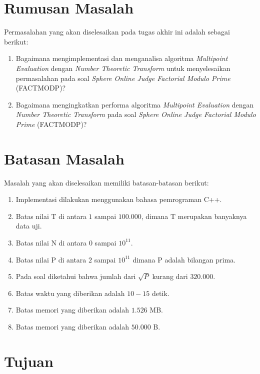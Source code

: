 \section {Rumusan Masalah}

Permasalahan yang akan diselesaikan pada tugas akhir ini adalah sebagai berikut:

\begin {enumerate}
\item Bagaimana mengimplementasi dan menganalisa algoritma \textit{Multipoint Evaluation} dengan \textit{Number Theoretic Transform} untuk menyelesaikan permasalahan pada soal \textit{Sphere Online Judge Factorial Modulo Prime} (FACTMODP\cite{factmodp})?
\item Bagaimana mengingkatkan performa algoritma \textit{Multipoint Evaluation} dengan \textit{Number Theoretic Transform} pada soal \textit{Sphere Online Judge Factorial Modulo Prime} (FACTMODP\cite{factmodp})?
\end {enumerate}

\section {Batasan Masalah}

Masalah yang akan diselesaikan memiliki batasan-batasan berikut:

\begin {enumerate}
\item Implementasi dilakukan menggunakan bahasa pemrograman C++.
\item Batas nilai T di antara $ 1 $ sampai $ 100.000 $, dimana T merupakan banyaknya data uji.
\item Batas nilai N di antara $ 0 $ sampai $ 10^{11} $.
\item Batas nilai P di antara $ 2 $ sampai $ 10^{11} $ dimana P adalah bilangan prima.
\item Pada soal diketahui bahwa jumlah dari $ \sqrt{P} $ kurang dari $ 320.000 $.
\item Batas waktu yang diberikan adalah $ 10-15 $ detik.
\item Batas memori yang diberikan adalah $ 1.526 $ MB.
\item Batas memori yang diberikan adalah $ 50.000 $ B.
\end {enumerate}

\section {Tujuan}

